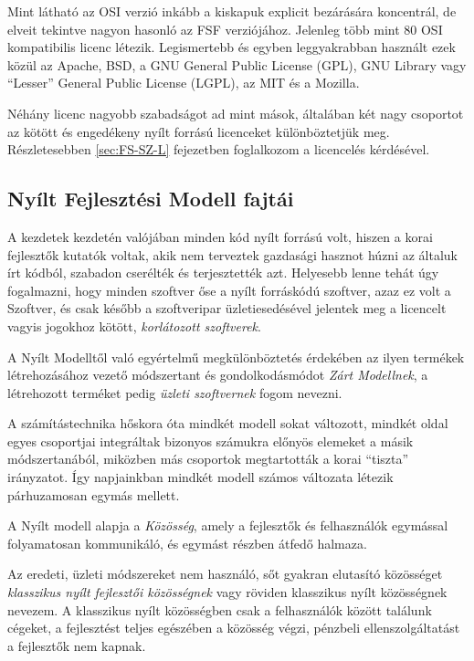 \documentclass[12pt,magyar,a4paper,oneside]{scrreprt}
\begin{document}
Mint látható az OSI verzió inkább a kiskapuk explicit bezárására
koncentrál, de elveit tekintve nagyon hasonló az FSF verziójához.
Jelenleg több mint 80 OSI kompatibilis licenc létezik. Legismertebb és
egyben leggyakrabban használt ezek közül az Apache, BSD, a GNU General
Public License (GPL), GNU Library vagy ``Lesser'' General Public License
(LGPL), az MIT és a Mozilla.

Néhány licenc nagyobb szabadságot ad mint mások, általában két nagy
csoportot az kötött és engedékeny nyílt forrású licenceket
különböztetjük meg. Részletesebben \ref{sec:FS-SZ-L} fejezetben
foglalkozom a licencelés kérdésével.

\hypertarget{nyuxedlt-fejlesztuxe9si-modell-fajtuxe1i}{%
\subsection{Nyílt Fejlesztési Modell
fajtái}\label{nyuxedlt-fejlesztuxe9si-modell-fajtuxe1i}}

A kezdetek kezdetén valójában minden kód nyílt forrású volt, hiszen a
korai fejlesztők kutatók voltak, akik nem terveztek gazdasági hasznot
húzni az általuk írt kódból, szabadon cserélték és terjesztették azt.
Helyesebb lenne tehát úgy fogalmazni, hogy minden szoftver őse a nyílt
forráskódú szoftver, azaz ez volt a Szoftver, és csak később a
szoftveripar üzletiesedésével jelentek meg a licencelt vagyis jogokhoz
kötött, \emph{korlátozott szoftverek}.

A Nyílt Modelltől való egyértelmű megkülönböztetés érdekében az ilyen
termékek létrehozásához vezető módszertant és gondolkodásmódot
\emph{Zárt Modellnek}, a létrehozott terméket pedig \emph{üzleti
szoftvernek} fogom nevezni.

A számítástechnika hőskora óta mindkét modell sokat változott, mindkét
oldal egyes csoportjai integráltak bizonyos számukra előnyös elemeket a
másik módszertanából, miközben más csoportok megtartották a korai
``tiszta'' irányzatot. Így napjainkban mindkét modell számos változata
létezik párhuzamosan egymás mellett.

A Nyílt modell alapja a \emph{Közösség}, amely a fejlesztők és
felhasználók egymással folyamatosan kommunikáló, és egymást részben
átfedő halmaza.

Az eredeti, üzleti módszereket nem használó, sőt gyakran elutasító
közösséget \emph{klasszikus nyílt fejlesztői közösségnek} vagy röviden
klasszikus nyílt közösségnek nevezem. A klasszikus nyílt közösségben
csak a felhasználók között találunk cégeket, a fejlesztést teljes
egészében a közösség végzi, pénzbeli ellenszolgáltatást a fejlesztők nem
kapnak.
\end{document}
